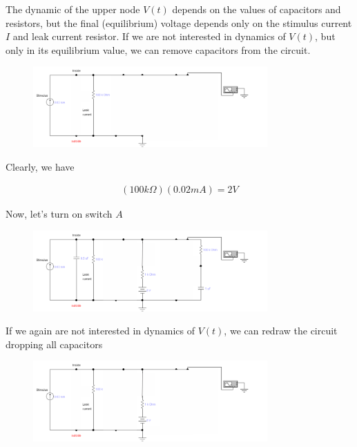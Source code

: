 \documentclass[12]{book}
\newcommand\0{\mathbf{0}}
\newcommand\<{\langle}
\renewcommand\>{\rangle}
\begin{document}
The dynamic of the upper node $V(t)$ depends on the values of capacitors and resistors, but the final (equilibrium) voltage depends only on the stimulus current $I$ and leak current resistor. If we are not interested in dynamics of $V(t)$, but only in its equilibrium value, we can remove capacitors from the circuit.
 
\begin{figure}[H]
\centering
\includegraphics[width=0.8\textwidth]{exercise1-2}
\end{figure}

Clearly, we have

\begin{align*}
(100k\Omega)(0.02 mA) = 	2V
\end{align*}

Now, let's turn on switch $A$
 
 \begin{figure}[H]
 \centering
\includegraphics[width=0.8\textwidth]{exercise1-3}
\end{figure}

If we again are not interested in dynamics of $V(t)$, we can redraw the circuit dropping all capacitors
 
 \begin{figure}[H]
 \centering
\includegraphics[width=0.8\textwidth]{exercise1-4}
\end{figure}
\end{document}
